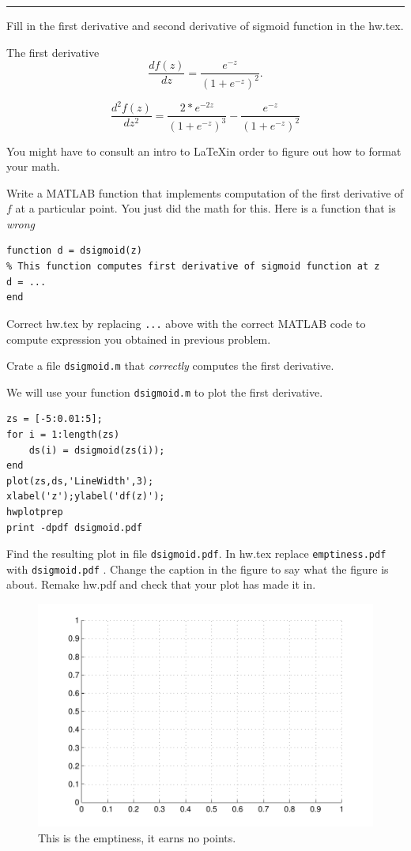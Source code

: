 \documentclass{article}
\begin{document}
\hrule

\newproblem{1pt}
Fill in the first derivative and second derivative of sigmoid function in the hw\theHW.tex.

The first derivative
\[
\frac{d f(z)}{dz} =  \frac{e^{-z}}{(1 + e^{-z})^2}.%
\]

\[
\frac{d^2 f(z)}{dz^2} = \frac{2 * e^{-2z}}{(1 + e^{-z})^3} - \frac{e^{-z}}{(1 + e^{-z})^2}
\]

You might have to consult an intro to \LaTeX in order to figure out how to format your math.

\newproblem{1pt}
Write a MATLAB function that implements computation  of the first derivative of $f$ at a particular point. You just did the math for this.
Here is a function that is {\em wrong}
\begin{verbatim}
function d = dsigmoid(z)
% This function computes first derivative of sigmoid function at z
d = ...
end
\end{verbatim}
Correct hw\theHW.tex by replacing {\tt ...} above with the correct MATLAB code to compute expression you obtained in previous problem.

Crate a file {\tt dsigmoid.m} that {\em correctly} computes the first derivative.

\newproblem{1pt}

We will use your function {\tt dsigmoid.m} to plot the first derivative.
\begin{verbatim}
zs = [-5:0.01:5];
for i = 1:length(zs)
    ds(i) = dsigmoid(zs(i));
end
plot(zs,ds,'LineWidth',3);
xlabel('z');ylabel('df(z)');
hwplotprep
print -dpdf dsigmoid.pdf
\end{verbatim}

Find the resulting plot in file {\tt dsigmoid.pdf}. In hw\theHW.tex replace {\tt emptiness.pdf} with {\tt dsigmoid.pdf} . Change the
caption in the figure to say what the figure is about. Remake hw\theHW.pdf and check that your plot has made it in.
\begin{figure}[H]
\begin{center}
\includegraphics[scale=0.5]{emptiness.pdf}
\caption{This is the emptiness, it earns no points.}
\end{center}
\end{figure}
\end{document}
